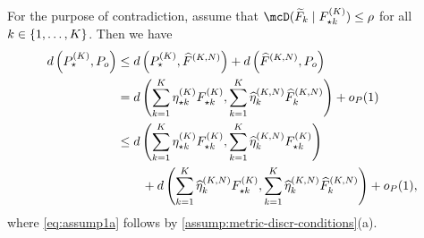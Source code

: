 For the purpose of contradiction, assume that $\discr{\widetilde{F}_{k}}{F^{(\numcomps)}_{\opt k}} \le \rho$ for all $k \in \{1,\ldots, K\}$. 
Then we have
\begin{align}
	 d\left(P^{(\numcomps)}_{\star}, P_{o}\right) 
	 & \le d\left(P^{(\numcomps)}_{\star}, \widehat{F}^{(\numcomps, \numobs)}\right) + d\left( \widehat{F}^{(\numcomps, \numobs)}, \datadist\right)\label{eq:trigin-ineq} \\
	 & = d\left(\sum_{k = 1}^{\numcomps}  \eta^{(\numcomps)}_{\star k}F^{(\numcomps)}_{\star k}, \sum_{k=1}^{\numcomps}\widehat{\eta}_k^{(\numcomps, \numobs)} \widehat{F}_k^{(\numcomps, \numobs)}\right) + \op(1) \label{eq:assump1a}\\
	 & \le d\left(\sum_{k = 1}^{\numcomps}  \eta^{(\numcomps)}_{\star k}F^{(\numcomps)}_{\star k}, \sum_{k = 1}^{\numcomps}  \widehat{\eta}_k^{(\numcomps, \numobs)} F^{(\numcomps)}_{\star k} \right) \\
   &\qquad + d\left(\sum_{k = 1}^{\numcomps}  \widehat{\eta}_k^{(\numcomps, \numobs)} F^{(\numcomps)}_{\star k}, \sum_{k=1}^{\numcomps}\widehat{\eta}_k^{(\numcomps, \numobs)} \widehat{F}_k^{(\numcomps, \numobs)}\right)
   + \op(1), \label{eq:decomp}
\end{align}
where \cref{eq:assump1a} follows by  \cref{assump:metric-discr-conditions}(a).
